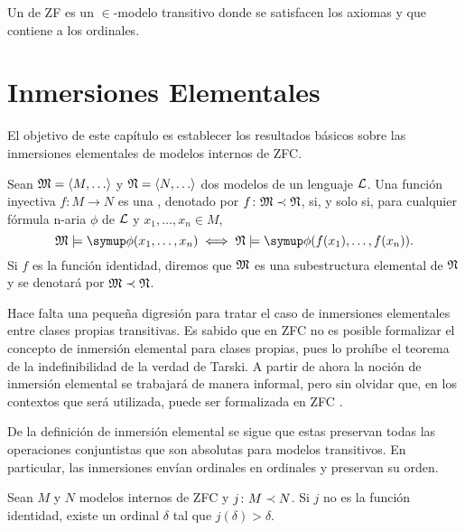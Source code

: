 \begin{defi}
    Un  de ZF es un $\in$-modelo transitivo
    donde se satisfacen los axiomas y que contiene a los ordinales.
\end{defi}

\section{Inmersiones Elementales}
\label{sec:elem-embed}

El objetivo de este capítulo es establecer los resultados básicos
sobre las inmersiones elementales de modelos internos de ZFC.

\begin{defi}
    Sean $\model{M} = \op{M,\dots}$ y $\model{N} = \op{N,\dots}$ dos modelos de un lenguaje $\mathcal { L }$.
    Una función inyectiva $f\colon M\to N$ es una ,
    denotado por $f\colon \mathfrak { M }\prec\mathfrak { N }$, si, y solo si, para cualquier fórmula
    n-aria $\phi$ de $\mathcal { L }$ y $x_1,\dots,x_n \in M$,
    \[
        \model{M}\models\phi(x_1,\dots,x_n) \iff \model{N}\models\phi(f(x_1),\dots,f(x_n)).
    \]
    Si $f$ es la función identidad, diremos que $\mathfrak { M }$
    es una subestructura elemental de $\mathfrak { N }$ y se denotará por $\mathfrak { M }\prec\mathfrak { N }$.
\end{defi}

Hace falta una pequeña digresión para tratar el caso de inmersiones elementales
entre clases propias transitivas. Es sabido que en ZFC no es posible formalizar
el concepto de inmersión elemental para clases propias, pues lo prohíbe el teorema
de la indefinibilidad de la verdad de Tarski.
A partir de ahora la noción de inmersión elemental se trabajará de manera informal,
pero sin olvidar que, en los contextos que será utilizada, puede ser formalizada
en ZFC \autocite[45-46]{kanamori_higher_2009}.

De la definición de inmersión elemental se sigue que estas preservan todas
las operaciones conjuntistas que son absolutas para modelos transitivos.
En particular, las inmersiones envían ordinales en ordinales y
preservan su orden.

\begin{teo}\label{teo:elem-embed-trivial}
    Sean $M$ y $N$ modelos internos de ZFC y $j\colon M\prec N$.
    Si $j$ no es la función identidad, existe un ordinal $\delta$
    tal que $j(\delta)>\delta$.
\end{teo}

